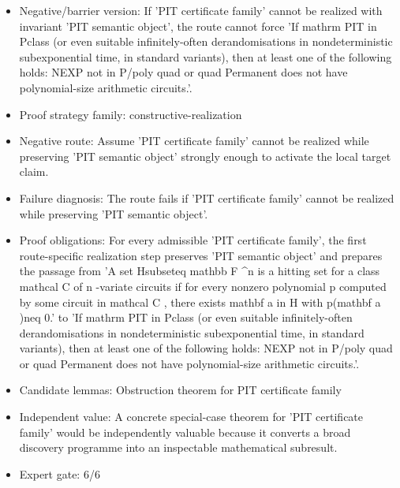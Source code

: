 \documentclass[11pt]{article}
\begin{document}
\begin{itemize}
\item Negative/barrier version: If 'PIT certificate family' cannot be realized with invariant 'PIT semantic object', the route cannot force 'If mathrm PIT in Pclass (or even suitable infinitely-often derandomisations in nondeterministic subexponential time, in standard variants), then at least one of the following holds: NEXP not in P/poly quad or quad Permanent does not have polynomial-size arithmetic circuits.'.
\item Proof strategy family: constructive-realization
\item Negative route: Assume 'PIT certificate family' cannot be realized while preserving 'PIT semantic object' strongly enough to activate the local target claim.
\item Failure diagnosis: The route fails if 'PIT certificate family' cannot be realized while preserving 'PIT semantic object'.
\item Proof obligations: For every admissible 'PIT certificate family', the first route-specific realization step preserves 'PIT semantic object' and prepares the passage from 'A set Hsubseteq mathbb F \textasciicircum{}n is a hitting set for a class mathcal C of n -variate circuits if for every nonzero polynomial p computed by some circuit in mathcal C , there exists mathbf a in H with p(mathbf a )neq 0.' to 'If mathrm PIT in Pclass (or even suitable infinitely-often derandomisations in nondeterministic subexponential time, in standard variants), then at least one of the following holds: NEXP not in P/poly quad or quad Permanent does not have polynomial-size arithmetic circuits.'.
\item Candidate lemmas: Obstruction theorem for PIT certificate family
\item Independent value: A concrete special-case theorem for 'PIT certificate family' would be independently valuable because it converts a broad discovery programme into an inspectable mathematical subresult.
\item Expert gate: 6/6
\end{itemize}
\end{document}
